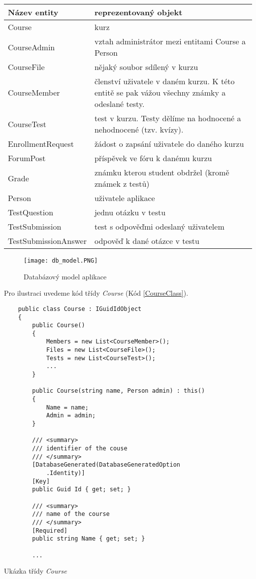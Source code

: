 \begin{table}[ht]
	\centering
	\begin{tabular}{| l | p{9cm} |}
		\hline
		Název entity & reprezentovaný objekt \\
		\hline \hline
		Course & kurz \\ \hline
		CourseAdmin & vztah administrátor mezi entitami Course a Person \\ \hline		
		CourseFile & nějaký soubor sdílený v kurzu \\ \hline
		CourseMember & členství uživatele v daném kurzu. 
		K této entitě se pak vážou všechny známky a odeslané testy. \\ \hline
		CourseTest & test v kurzu. Testy dělíme na hodnocené a nehodnocené (tzv. kvízy). \\ \hline
		EnrollmentRequest & žádost o zapsání uživatele do daného kurzu \\ \hline
		ForumPost & příspěvek ve fóru k danému kurzu \\ \hline
		Grade & známku kterou student obdržel (kromě známek z testů) \\ \hline
		Person & uživatele aplikace \\ \hline
		TestQuestion & jednu otázku v testu \\ \hline
		TestSubmission & test s odpověďmi odeslaný uživatelem \\ \hline
		TestSubmissionAnswer & odpověď k dané otázce v testu \\
		\hline
	\end{tabular}
\end{table}

\newpage

\begin{figure}
	\centering
	\texttt{[image: db\_model.PNG]}
	\caption{Databázový model aplikace}
	\label{fig:DbModel}
\end{figure}

\newpage

Pro ilustraci uvedeme kód třídy \textit{Course} (Kód \ref{CourseClass}).

\begin{program}
	\begin{lstlisting}
	public class Course : IGuidIdObject
	{
		public Course()
		{
			Members = new List<CourseMember>();
			Files = new List<CourseFile>();
			Tests = new List<CourseTest>();
			...
		}
		
		public Course(string name, Person admin) : this()
		{
			Name = name;
			Admin = admin;
		}
		
		/// <summary>
		/// identifier of the couse
		/// </summary>
		[DatabaseGenerated(DatabaseGeneratedOption
			.Identity)]
		[Key]
		public Guid Id { get; set; }
		
		/// <summary>
		/// name of the course
		/// </summary>
		[Required]
		public string Name { get; set; }
		
		...
	\end{lstlisting}
	\caption{Ukázka třídy \textit{Course}}
	\label{CourseClass}
\end{program}

